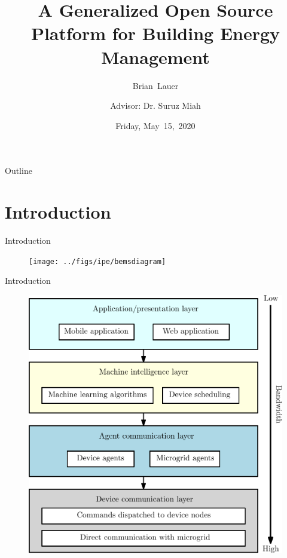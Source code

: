 \documentclass{beamer}
\title[Progress Update]{A Generalized Open Source Platform for Building Energy Management}
\author[B.~Lauer]{Brian~Lauer\\\and
Advisor: Dr. Suruz Miah}
\institute[Bradley University] %
{
  Department of Electrical and Computer Engineering\\
  Bradley University\\
  1501 W. Bradley Avenue\\
  Peoria, IL, 61625, USA
}
\date[May~15,~2020]{Friday, May~15,~2020}
\begin{document}
\begin{frame}
  \titlepage
\end{frame}

\begin{frame}{Outline}
  \tableofcontents
\end{frame}

\section{Introduction}

\begin{frame}{Introduction}{}
  \begin{figure}
  	\texttt{[image: ../figs/ipe/bemsdiagram]}
  \end{figure}
\end{frame}

\begin{frame}{Introduction}{}
	\begin{figure}
		\includegraphics[scale=0.4]{../figs/ipe/BEMS-softwareArchitecture}
	\end{figure}
\end{frame}
\end{document}
